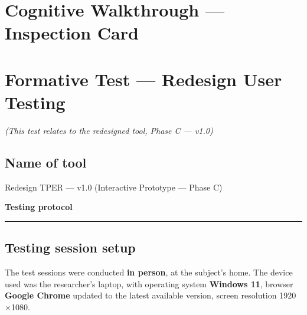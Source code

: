 ﻿\documentclass[11pt,a4paper]{article}
\begin{document}
\newpage

\section{Cognitive Walkthrough --- Inspection Card}
\label{sec:inspection-card}




\newpage

\section{Formative Test --- Redesign User Testing}
\textit{(This test relates to the redesigned tool, Phase C --- v1.0)}

\vspace{0.2cm}

\subsection*{Name of tool}
\begin{tcolorbox}[base]
Redesign TPER --- v1.0 (Interactive Prototype --- Phase C)
\end{tcolorbox}

\vspace{0.2cm}

\begin{center}
  {\color{primaryColor}\large\bfseries Testing protocol}
  \vspace{0.1cm}
  \color{borderColor}\hrule
\end{center}

\vspace{0.2cm}

\subsection*{Testing session setup}
\begin{tcolorbox}[base]
The test sessions were conducted \textbf{in person},
at the subject's home. The device used was
the researcher's laptop, with operating system
\textbf{Windows 11}, browser \textbf{Google Chrome} updated
to the latest available version, screen resolution 1920$\times$1080.
\end{tcolorbox}
\end{document}
